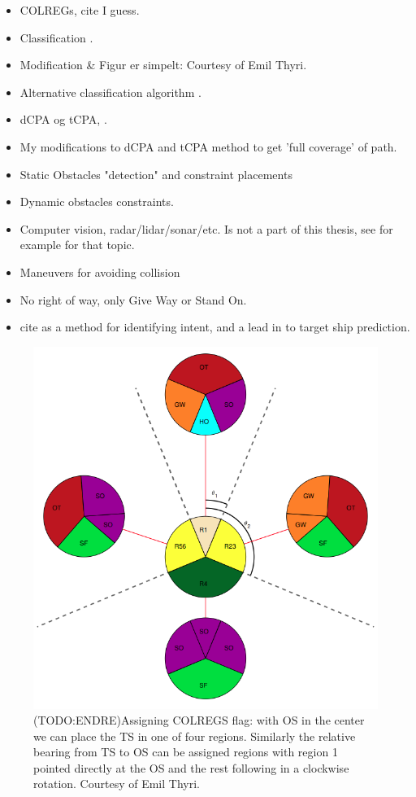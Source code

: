 \begin{itemize}
    \item \gls{COLREGs}, cite \cite{WikisourceCOLREGS} I guess.
    \item Classification \cite{tam2010collision}.
    \item Modification \& Figur er simpelt: Courtesy of Emil Thyri.
    \item Alternative classification algorithm \cite{woerner2016multi}.
    \item dCPA og tCPA, \cite{Kufoalor2018}.
    \item My modifications to dCPA and tCPA method to get 'full coverage' of path.
    \item Static Obstacles "detection" and constraint placements
    \item Dynamic obstacles constraints.
    \item Computer vision, radar/lidar/sonar/etc. Is not a part of this thesis, see for example \cite{ruud2018lidar} for that topic.
    \item Maneuvers for avoiding collision \cite{cockcroft2012manoeuvres}
    \item No right of way, only Give Way or Stand On.
    \item cite \cite{cho2018intent} as a method for identifying intent, and a lead in to target ship prediction.
\end{itemize}

\begin{figure}
    \centering
    \includegraphics[height=0.35\textheight]{Images/COLREGs_assess.png}
    \caption{(TODO:ENDRE)Assigning COLREGS flag: with OS in the center we can place the TS in one of four regions. Similarly the relative bearing from TS to OS can be assigned regions with region 1 pointed directly at the OS and the rest following in a clockwise rotation.
    Courtesy of Emil Thyri.}
    \label{FIG: COLREGs Classification}
\end{figure}

